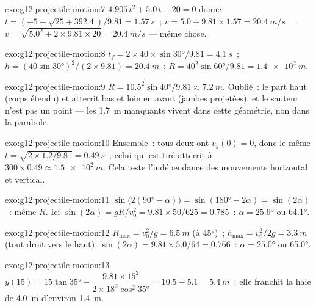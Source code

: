 \begin{solution}{exo:g12:projectile-motion:7}
$4.905\,t^2 + 5.0\,t - 20 = 0$ donne
$t = (-5 + \sqrt{25 + 392.4})/9.81 = \qty{1.57}{s}$~;
$v = 5.0 + 9.81 \times 1.57 = \qty{20.4}{m/s}$. ~:
$v = \sqrt{5.0^2 + 2 \times 9.81 \times 20} = \qty{20.4}{m/s}$ ---
même chose.
\end{solution}

\begin{solution}{exo:g12:projectile-motion:8}
$t_f = 2 \times 40 \times \sin\ang{30}/9.81 = \qty{4.1}{s}$~;
$h = (40\sin\ang{30})^2/(2 \times 9.81) = \qty{20.4}{m}$~;
$R = 40^2 \sin\ang{60}/9.81 = \qty{1.4e2}{m}$.
\end{solution}

\begin{solution}{exo:g12:projectile-motion:9}
$R = 10.5^2\sin\ang{40}/9.81 \approx \qty{7.2}{m}$. Oublié~: le
 part haut (corps étendu) et atterrit bas et
loin en avant (jambes projetées), et le sauteur n'est pas un point
--- les \qty{1.7}{m} manquants vivent dans cette géométrie, non dans
la parabole.
\end{solution}

\begin{solution}{exo:g12:projectile-motion:10}
Ensemble~: tous deux ont $v_y(0) = 0$, donc le même
$t = \sqrt{2 \times 1.2/9.81} = \qty{0.49}{s}$~; celui qui est tiré
atterrit à $300 \times 0.49 \approx \qty{1.5e2}{m}$. Cela teste
l'indépendance des mouvements horizontal et vertical.
\end{solution}

\begin{solution}{exo:g12:projectile-motion:11}
$\sin\bigl(2(\ang{90}-\alpha)\bigr) = \sin(\ang{180}-2\alpha) =
\sin(2\alpha)$~: même $R$. Ici $\sin(2\alpha) = gR/v_0^2 =
9.81 \times 50/625 = 0.785$~: $\alpha = \ang{25.9}$ ou \ang{64.1}.
\end{solution}

\begin{solution}{exo:g12:projectile-motion:12}
$R_{\max} = v_0^2/g = \qty{6.5}{m}$ (à \ang{45})~;
$h_{\max} = v_0^2/2g = \qty{3.3}{m}$ (tout droit vers le haut).
$\sin(2\alpha) = 9.81 \times 5.0/64 = 0.766$~: $\alpha = \ang{25.0}$
ou \ang{65.0}.
\end{solution}

\begin{solution}{exo:g12:projectile-motion:13}
$y(15) = 15\tan\ang{35} - \dfrac{9.81 \times 15^2}
{2 \times 18^2 \cos^2\ang{35}} = 10.5 - 5.1 = \qty{5.4}{m}$~:
elle franchit la haie de \qty{4.0}{m} d'environ \qty{1.4}{m}.
\end{solution}

